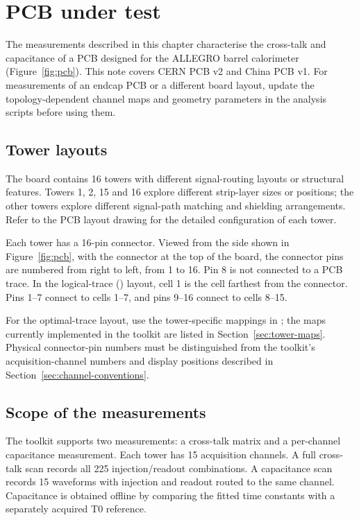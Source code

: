 \section{PCB under test}
\label{sec:pcb-overview}
The measurements described in this chapter characterise the cross-talk and capacitance of a PCB designed for the ALLEGRO barrel calorimeter (Figure~\ref{fig:pcb}). This note covers CERN PCB v2 and China PCB v1. For measurements of an endcap PCB or a different board layout, update the topology-dependent channel maps and geometry parameters in the analysis scripts before using them.

\subsection{Tower layouts}
The board contains 16 towers with different signal-routing layouts or structural features. Towers 1, 2, 15 and 16 explore different strip-layer sizes or positions; the other towers explore different signal-path matching and shielding arrangements. Refer to the PCB layout drawing for the detailed configuration of each tower.

Each tower has a 16-pin connector. Viewed from the side shown in Figure~\ref{fig:pcb}, with the connector at the top of the board, the connector pins are numbered from right to left, from 1 to 16. Pin 8 is not connected to a PCB trace. In the logical-trace () layout, cell 1 is the cell farthest from the connector. Pins 1--7 connect to cells 1--7, and pins 9--16 connect to cells 8--15.

For the optimal-trace layout, use the tower-specific mappings in ; the maps currently implemented in the toolkit are listed in Section~\ref{sec:tower-maps}. Physical connector-pin numbers must be distinguished from the toolkit's acquisition-channel numbers and display positions described in Section~\ref{sec:channel-conventions}.

\subsection{Scope of the measurements}
The toolkit supports two measurements: a cross-talk matrix and a per-channel capacitance measurement. Each tower has 15 acquisition channels. A full cross-talk scan records all 225 injection/readout combinations. A capacitance scan records 15 waveforms with injection and readout routed to the same channel. Capacitance is obtained offline by comparing the fitted time constants with a separately acquired T0 reference.

